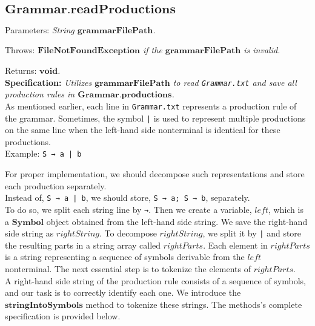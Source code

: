 \vspace{30pt}

\subsection*{\(\boldsymbol{Grammar.readProductions}\)}

Parameters: \textit{String \(\boldsymbol{grammarFilePath}\).}

Throws: \textit{\(\boldsymbol{FileNotFoundException}\) if the \(\boldsymbol{grammarFilePath}\) is invalid.}

Returns: \textit{\(\boldsymbol{void}\).}\\

\textbf{Specification:} \textit{Utilizes \(\boldsymbol{grammarFilePath}\) to read \texttt{Grammar.txt} and save all production rules in \(\boldsymbol{Grammar.productions}\).}\\

As mentioned earlier, each line in \texttt{Grammar.txt} represents a production rule of the grammar. Sometimes, the symbol \texttt{|} is used to represent multiple productions on the same line when the left-hand side nonterminal is identical for these productions.\\

Example: \texttt{S → a | b}

For proper implementation, we should decompose such representations and store each production separately.\\

Instead of,  \texttt{S → a | b}, we should store,  \texttt{S → a; S → b}, separately.\\

To do so, we split each string line by  \texttt{→}. Then we create a variable, \(left\), which is a \(\boldsymbol{Symbol}\) object obtained from the left-hand side string. We save the right-hand side string as  \(rightString\). To decompose  \(rightString\), we split it by \texttt{|} and store the resulting parts in a string array called \(rightParts\). Each element in \(rightParts\) is a string representing a sequence of symbols derivable from the \(left\) nonterminal. The next essential step is to tokenize the elements of \(rightParts\).\\

A right-hand side string of the production rule consists of a sequence of symbols, and our task is to correctly identify each one. We introduce the \(\boldsymbol{stringIntoSymbols}\) method to tokenize these strings. The methods’s complete specification is provided below.\\

